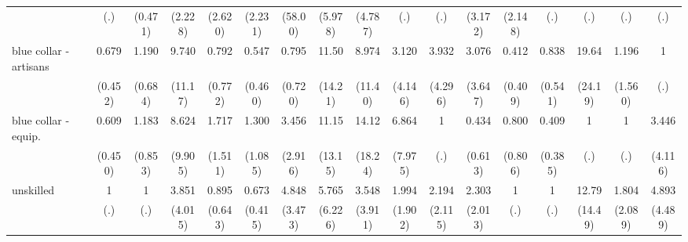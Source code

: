 {\begin{tabular}{l*{16}{c}}
                    &         (.)         &     (0.471)         &     (2.228)         &     (2.620)         &     (2.231)         &     (58.00)         &     (5.978)         &     (4.787)         &         (.)         &         (.)         &     (3.172)         &     (2.148)         &         (.)         &         (.)         &         (.)         &         (.)         \\
[1em]
blue collar - artisans&       0.679         &       1.190         &       9.740\sym{*}  &       0.792         &       0.547         &       0.795         &       11.50\sym{*}  &       8.974         &       3.120         &       3.932         &       3.076         &       0.412         &       0.838         &       19.64\sym{*}  &       1.196         &           1         \\
                    &     (0.452)         &     (0.684)         &     (11.17)         &     (0.772)         &     (0.460)         &     (0.720)         &     (14.21)         &     (11.40)         &     (4.146)         &     (4.296)         &     (3.647)         &     (0.409)         &     (0.541)         &     (24.19)         &     (1.560)         &         (.)         \\
[1em]
blue collar - equip.&       0.609         &       1.183         &       8.624         &       1.717         &       1.300         &       3.456         &       11.15\sym{*}  &       14.12\sym{*}  &       6.864         &           1         &       0.434         &       0.800         &       0.409         &           1         &           1         &       3.446         \\
                    &     (0.450)         &     (0.853)         &     (9.905)         &     (1.511)         &     (1.085)         &     (2.916)         &     (13.15)         &     (18.24)         &     (7.975)         &         (.)         &     (0.613)         &     (0.806)         &     (0.385)         &         (.)         &         (.)         &     (4.116)         \\
[1em]
unskilled           &           1         &           1         &       3.851         &       0.895         &       0.673         &       4.848\sym{*}  &       5.765         &       3.548         &       1.994         &       2.194         &       2.303         &           1         &           1         &       12.79\sym{*}  &       1.804         &       4.893         \\
                    &         (.)         &         (.)         &     (4.015)         &     (0.643)         &     (0.415)         &     (3.473)         &     (6.226)         &     (3.911)         &     (1.902)         &     (2.115)         &     (2.013)         &         (.)         &         (.)         &     (14.49)         &     (2.089)         &     (4.489)         \\

\end{tabular}}
